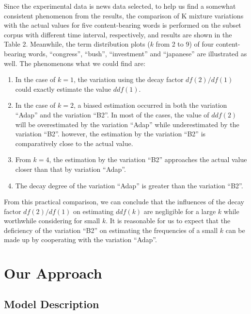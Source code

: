 \documentclass[english]{jnlp_1.4_rep}
\begin{document}
\begin{table}[p]

\end{table}

Since the experimental data is news data selected, to help us find a somewhat consistent phenomenon from the results, the comparison of K mixture
variations with the actual values for five content-bearing words is performed on the subset corpus with different time interval, respectively, and
results are shown in the Table 2. Meanwhile, the term distribution plots ($k$ from 2 to 9) of four content-bearing words, ``congress'', ``bush'',
``investment'' and ``japanese'' are illustrated as well. The phenomenons what we could find are:
\pagebreak
\begin{enumerate}
\item In the case of $k=1$, the variation using the decay factor $\mathit{df}(2) / \mathit{df}(1)$ could exactly estimate the value $\mathit{ddf}(1)$.
\item In the case of $k=2$, a biased estimation occurred in both the variation ``Adap'' and the variation ``B2''.
In most of the cases, the value of $\mathit{ddf}(2)$ will be overestimated by the variation ``Adap'' while underestimated by the variation ``B2''.
however, the estimation by the variation ``B2'' is comparatively close to the actual value.
\item From $k=4$, the estimation by the variation ``B2'' approaches the actual value closer than that by variation ``Adap''.
\item The decay degree of the variation ``Adap'' is greater than the variation ``B2''.
\end{enumerate}
From this practical comparison, we can conclude that the influences of the decay factor $\mathit{df}(2) / \mathit{df}(1)$ on estimating
$\mathit{ddf}(k)$ are negligible for a large $k$ while worthwhile considering for small $k$. It is reasonable for us to expect that the deficiency
of the variation ``B2'' on estimating the frequencies of a small $k$ can be made up by cooperating with the variation ``Adap''.



\section{Our Approach}

\subsection{Model Description}
\end{document}
